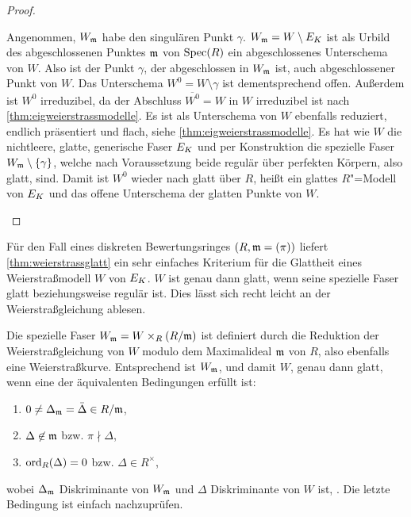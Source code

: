 \begin{Satz}
\begin{proof}
\begin{enumerate}[resume*,start=1]
      Angenommen, $W_{\mathfrak{m}}$ habe den singulären Punkt $\gamma$.
      $W_{\mathfrak{m}}=W\setminus E_{K}$ ist als Urbild des abgeschlossenen Punktes
      $\mathfrak{m}$ von $\operatorname{Spec}(R)$ ein abgeschlossenes Unterschema von $W$.
      Also ist der Punkt $\gamma$, der abgeschlossen in $W_{\mathfrak{m}}$ ist, auch
      abgeschlossener Punkt von $W$.
      Das Unterschema $W^0=W\setminus\gamma$ ist dementsprechend offen.
      Außerdem ist $W^0$ irreduzibel, da der Abschluss
      $\overline{W^0}=W$ in $W$ irreduzibel ist nach
      \ref{thm:eigweierstrassmodelle}.
      Es ist als Unterschema von $W$ ebenfalls reduziert, endlich
      präsentiert und flach, siehe \ref{thm:eigweierstrassmodelle}.
      Es hat wie $W$ die nichtleere, glatte, generische Faser $E_{K}$ und
      per Konstruktion die spezielle Faser ${W_{\mathfrak{m}}\setminus\{\gamma\}}$,
      welche nach Voraussetzung beide regulär über perfekten Körpern,
      also glatt, sind.
      Damit ist $W^0$ wieder nach \cite[Proposition~8.5/17]{bosch}
      glatt über $R$, heißt ein glattes $R$"=Modell von $E_{K}$ und das
      offene Unterschema der glatten Punkte von $W$.
      \qedhere
    \end{enumerate}
  \end{proof}
\end{Satz}

\begin{Bemerkung}\label{thm:weierstraßmodellglatt}
  Für den Fall eines diskreten Bewertungsringes $(R,\mathfrak{m}=(\pi))$ liefert
  \ref{thm:weierstrassglatt} ein sehr einfaches Kriterium für die
  Glattheit eines Weierstraßmodell $W$ von $E_{K}$.
  $W$ ist genau dann glatt, wenn seine spezielle Faser glatt
  beziehungsweise regulär ist.
  Dies lässt sich recht leicht an der Weierstraßgleichung ablesen.
  
  Die spezielle Faser $W_{\mathfrak{m}}=W\times_R (R/\mathfrak{m})$ ist definiert
  durch die Reduktion der Weierstraßgleichung von $W$ modulo dem
  Maximalideal $\mathfrak{m}$ von $R$, also ebenfalls eine Weierstraßkurve.
  Entsprechend ist $W_{\mathfrak{m}}$, und damit $W$, genau dann glatt, wenn
  eine der äquivalenten Bedingungen erfüllt ist:
  \begin{enumerate}[label=(\roman*)]
  \item $0\neq\Delta_{\mathfrak{m}}=\bar\Delta\in R/\mathfrak{m}$,
  \item $\Delta\not\in\mathfrak{m}$ bzw. $\pi\nmid\Delta$,
  \item $\operatorname{ord}_R(\Delta)=0$ bzw. $\Delta\in R^\times$,
  \end{enumerate}
  wobei $\Delta_{\mathfrak{m}}$ Diskriminante von $W_{\mathfrak{m}}$ und $\Delta$
  Diskriminante von $W$ ist,
  \cite[vgl.][Proposition~VII.5.1~(a)]{silverman}.
  Die letzte Bedingung ist einfach nachzuprüfen.
\end{Bemerkung}


